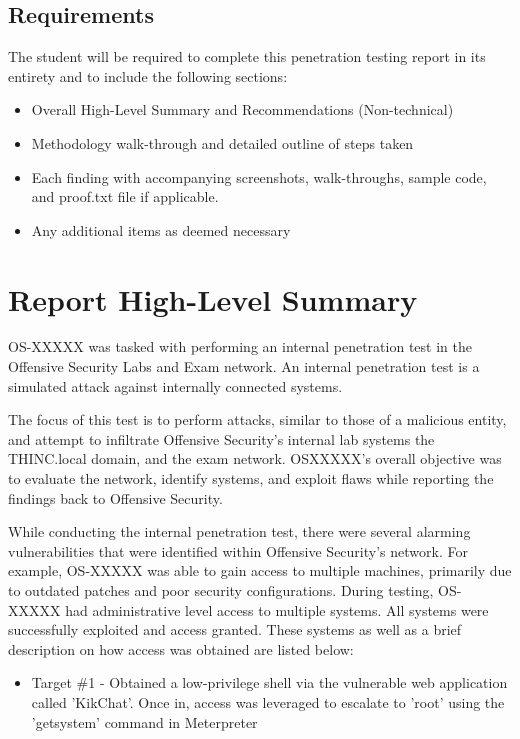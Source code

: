 \documentclass[a4paper, 10pt, oneside]{article}
\begin{document}
\subsection{Requirements}
The	student	will	be	required	to	complete	this	penetration	testing	report	in	its	entirety and	to	include	the	
following	sections:
\begin{itemize}
  \item Overall	High-Level	Summary and	Recommendations	(Non-technical)
  \item Methodology	walk-through	and	detailed	outline	of	steps	taken
  \item Each	 finding	with accompanying screenshots,	walk-throughs,	 sample code,	and	 proof.txt file if
applicable.
  \item Any	additional	items	as	deemed	necessary
\end{itemize}

\section{	Report High-Level	Summary}

OS-XXXXX	was	 tasked	with	 performing	an	internal	 penetration	 test in	 the Offensive	Security Labs and	
Exam	network.	An	internal	penetration	test is	a	simulated attack	against	internally	connected	systems.
	
The	 focus	 of	 this	 test	 is	 to	 perform	 attacks,	 similar	 to	 those	 of	 a	 malicious	 entity, and	 attempt to	
infiltrate	Offensive	Security's	internal	lab	systems the	THINC.local domain,	and	the	exam	network. OSXXXXX's	 overall	 objective	 was	 to	 evaluate	 the	 network,	 identify	 systems,	 and	 exploit	 flaws	 while	
reporting the	findings	back	to	Offensive	Security.

While conducting the	 internal	 penetration	 test,	 there	 were	 several	 alarming	 vulnerabilities	 that	were	
identified	 within Offensive	 Security's	 network.	 For	 example,	 OS-XXXXX	 was	 able	 to	 gain	 access	 to	
multiple	machines,	primarily	due	to	outdated	patches	and	poor	security	configurations.		During	testing,	
OS-XXXXX	had	administrative	level	access	 to	multiple	 systems.	All	 systems	were	 successfully	exploited	
and	access	granted.	These	systems	as	well	as	a	brief	description	on	how	access	was	obtained	are	listed	
below:



\begin{itemize}
        \item Target \#1	- Obtained a	low-privilege shell	via	the	vulnerable	web	application	called	'KikChat'.	
Once	in,	access	was	leveraged	to	escalate to	'root'	using	the	'getsystem' command	in	
Meterpreter
\end{itemize}
\end{document}
